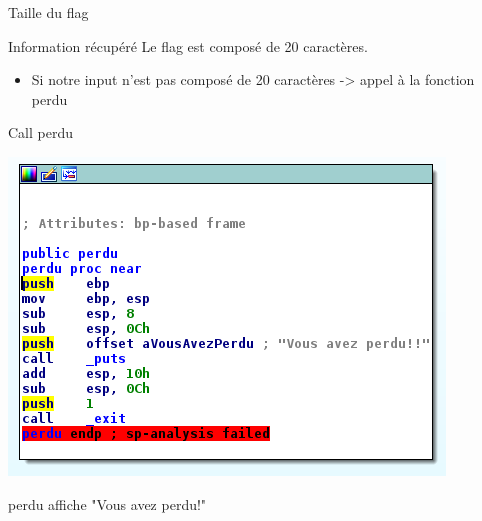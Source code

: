 \documentclass[10pt,sans,usenames,dvipsnames,french,compress]{beamer}
\begin{document}
\begin{frame}[fragile]{Taille du flag}
\begin{block}{Information récupéré}
	  Le flag est composé de 20 caractères.
		\end{block}
	\begin{exampleblock}{}
		\begin{itemize}
			  
		\item Si notre input n'est pas composé de 20 caractères -> appel à la fonction perdu
	
			\end{itemize}
\end{exampleblock}

\end{frame}	
\begin{frame}[fragile]{Call perdu}
 \begin{center}
			\includegraphics[width=0.5\linewidth]{114/perdu.png}
			
		\end{center}
\begin{block}{}
	  perdu affiche "Vous avez perdu!"
		\end{block}
		\end{frame} 
		
\end{document}

